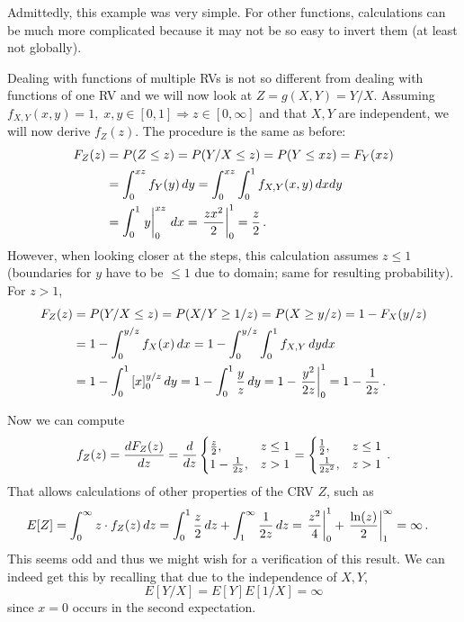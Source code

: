 Admittedly, this example was very simple. For other functions, calculations can be much more complicated because it may not be so easy to invert them (at least not globally).
\begin{ex}
Dealing with functions of multiple RVs is not so different from dealing with functions of one RV and we will now look at $Z = g(X, Y) = Y / X$. Assuming $f_{X, Y}(x, y) = 1, \; x, y \in [0, 1] \Rightarrow z \in [0, \infty]$ and that $X, Y$ are independent, we will now derive $f_Z(z)$. The procedure is the same as before:
\begin{align*}
F_Z(z) &= P(Z \leq z) = P(Y / X \leq z) = P(Y \leq x z) = F_Y(x z)
\\
&= \int_0^{x z} f_Y(y) \, dy = \int_0^{x z} \int_0^1 f_{X, Y}(x, y) \, dx dy
\\
&= \int_0^1 \eval{y}_0^{x z} \, dx = \eval{\frac{z x^2}{2}}_0^1 = \frac{z}{2} \, .
\end{align*}
However, when looking closer at the steps, this calculation assumes $z \leq 1$ (boundaries for $y$ have to be $\leq 1$ due to domain; same for resulting probability). For $z > 1$,
\begin{align*}
F_Z(z) &= P(Y / X \leq z) = P(X / Y \geq 1 / z) = P(X \geq y / z) = 1 - F_X(y / z)
\\
&= 1 - \int_0^{y / z} f_X(x) \, dx = 1 - \int_0^{y / z} \int_0^1 f_{X, Y} \, dy dx
\\
&= 1 - \int_0^1 \qty[x]_0^{y / z} \, dy = 1 - \int_0^1 \frac{y}{z} \, dy = 1 - \eval{\frac{y^2}{2 z}}_0^1 = 1 - \frac{1}{2 z} \, .
\end{align*}

Now we can compute
\begin{equation*}
f_Z(z) = \dv{F_Z(z)}{z} = \dv{z} \begin{cases} \frac{z}{2}, & z \leq 1 \\ 1 - \frac{1}{2 z}, & z > 1 \end{cases} = \begin{cases} \frac{1}{2}, & z \leq 1 \\ \frac{1}{2 z^2}, & z > 1 \end{cases} \, .
\end{equation*}
That allows calculations of other properties of the CRV $Z$, such as
\begin{align*}
E[Z] &= \int_0^\infty z \cdot f_Z(z) \, dz = \int_0^1 \frac{z}{2} \, dz + \int_1^\infty \frac{1}{2 z} \, dz = \eval{\frac{z^2}{4}}_0^1 + \eval{\frac{\ln(z)}{2}}_1^\infty = \infty \, .
\end{align*}
This seems odd and thus we might wish for a verification of this result. We can indeed get this by recalling that due to the independence of $X, Y$,
\begin{equation*}
E[Y / X] = E[Y] E[1 / X] = \infty
\end{equation*}
since $x = 0$ occurs in the second expectation.
\end{ex}

